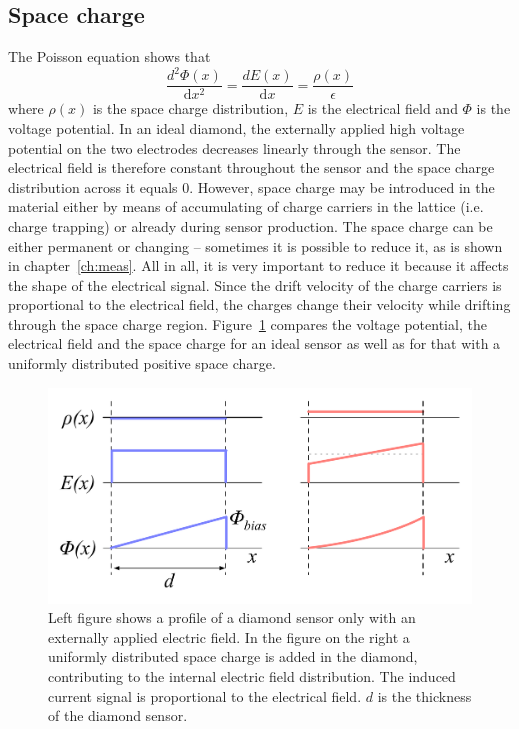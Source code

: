\subsection{Space charge}
The Poisson equation shows that 
\begin{equation}
\label{eq:poisson}
\frac{d^2\Phi(x)}{\mathrm{d}x^2} = \frac{dE(x)}{\mathrm{d}x} = \frac{\rho(x)}{\epsilon}
\end{equation}
where $\rho(x)$ is the space charge distribution, $E$ is the electrical field and $\Phi$ is the voltage potential. In an ideal diamond, the externally applied high voltage potential on the two electrodes decreases linearly through the sensor. The electrical field is therefore constant throughout the sensor and the space charge distribution across it equals 0. However, space charge may be introduced in the material either by means of accumulating of charge carriers in the lattice (i.e. charge trapping) or already during sensor production. The space charge can be either permanent or changing -- sometimes it is possible to reduce it, as is shown in chapter~\ref{ch:meas}. All in all, it is very important to reduce it because it affects the shape of the electrical signal. Since the drift velocity of the charge carriers is proportional to the electrical field, the charges change their velocity while drifting through the space charge region. Figure~\ref{fig:spcchg} compares the voltage potential, the electrical field and the space charge for an ideal sensor as well as for that with a uniformly distributed positive space charge.
\begin{figure}[!t]
\begin{center}
\includegraphics[width=0.6\linewidth]{02_pulse_formation/pics/plots/spcchg}
\caption{Left figure shows a profile of a diamond sensor only with an externally applied electric field. In the figure on the right a uniformly distributed space charge is added in the diamond, contributing to  the internal electric field distribution. The induced current signal is proportional to the electrical field. $d$ is the thickness of the diamond sensor.}
\label{fig:spcchg}
\end{center}
\end{figure}



